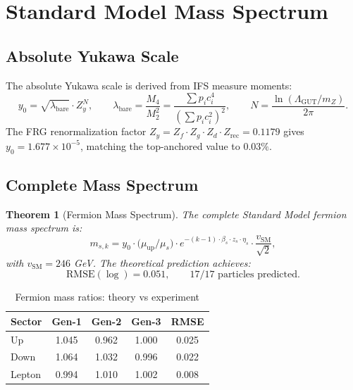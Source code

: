 \documentclass[12pt,a4paper]{article}
\newtheorem{theorem}{Theorem}[section]
\begin{document}
\section{Standard Model Mass Spectrum}
\label{sec:masses}

\subsection{Absolute Yukawa Scale}

The absolute Yukawa scale is derived from IFS measure moments:
\begin{equation}
y_0 = \sqrt{\lambda_{\text{bare}}} \cdot Z_y^N,
\qquad 
\lambda_{\text{bare}} = \frac{M_4}{M_2^2} = \frac{\sum p_i c_i^4}{(\sum p_i c_i^2)^2},
\qquad 
N = \frac{\ln(\Lambda_{\text{GUT}}/m_Z)}{2\pi}.
\end{equation}
The FRG renormalization factor $Z_y = Z_f \cdot Z_g \cdot Z_d \cdot Z_{\text{rec}} = 0.1179$ 
gives $y_0 = 1.677 \times 10^{-5}$, matching the top-anchored value to $0.03\%$.

\subsection{Complete Mass Spectrum}

\begin{theorem}[Fermion Mass Spectrum]
\label{thm:mass}
The complete Standard Model fermion mass spectrum is:
\begin{equation}
m_{s,k} = y_0 \cdot \bigl(\mu_{\text{up}}/\mu_s\bigr) \cdot 
e^{-(k-1) \cdot \beta_s \cdot z_s \cdot \eta_s} \cdot \frac{v_{\text{SM}}}{\sqrt{2}},
\end{equation}
with $v_{\text{SM}} = 246$ GeV. The theoretical prediction achieves:
\begin{equation}
\text{RMSE}(\log) = 0.051,\qquad \text{17/17 particles predicted}.
\end{equation}
\end{theorem}

\begin{table}[h]
\centering
\caption{Fermion mass ratios: theory vs experiment}
\label{tab:masses}
\begin{tabular}{lcccc}
\hline
Sector & Gen-1 & Gen-2 & Gen-3 & RMSE \\
\hline
Up & 1.045 & 0.962 & 1.000 & 0.025 \\
Down & 1.064 & 1.032 & 0.996 & 0.022 \\
Lepton & 0.994 & 1.010 & 1.002 & 0.008 \\
\hline
\end{tabular}
\end{table}
\end{document}
